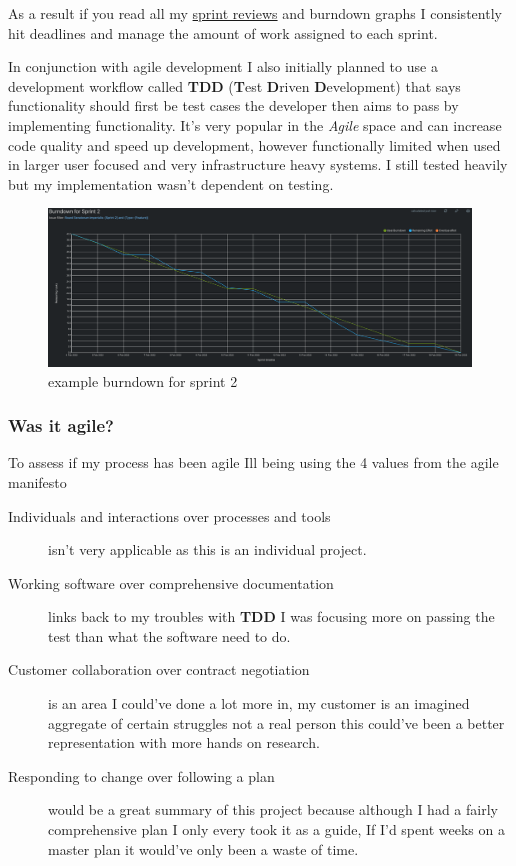 As a result if you read all my \href{https://github.com/MrHarrisonBarker/CRPL/blob/main/README.md}{sprint reviews} and burndown graphs I consistently hit deadlines and manage the amount of work assigned to each sprint. 

In conjunction with agile development I also initially planned to use a development workflow called \textbf{TDD} (\textbf{T}est \textbf{D}riven \textbf{D}evelopment) that says functionality should first be test cases the developer then aims to pass by implementing functionality. It's very popular in the \textit{Agile} space and can increase code quality and speed up development, however functionally limited when used in larger user focused and very infrastructure heavy systems. I still tested heavily but my implementation wasn't dependent on testing.

\begin{figure}[H]
\caption{example burndown for sprint 2}
\centering
\includegraphics[width=\textwidth,height=\textheight,keepaspectratio]{images/burndown-2}
\end{figure}

\subsubsection{Was it agile?}

To assess if my process has been agile Ill being using the 4 values from the agile manifesto\cite{agile}

\begin{description}
	\item[Individuals and interactions over processes and tools] isn't very applicable as this is an individual project.
	\item[Working software over comprehensive documentation] links back to my troubles with \textbf{TDD} I was focusing more on passing the test than what the software need to do. 
	\item[Customer collaboration over contract negotiation] is an area I could've done a lot more in, my customer is an imagined aggregate of certain struggles not a real person this could've been a better representation with more hands on research.
	\item[Responding to change over following a plan] would be a great summary of this project because although I had a fairly comprehensive plan I only every took it as a guide, If I'd spent weeks on a master plan it would've only been a waste of time.
\end{description}

